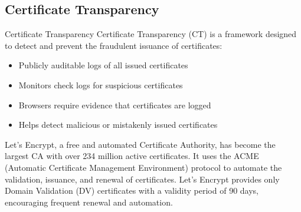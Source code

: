 \subsection{Certificate Transparency}

\begin{concept}{Certificate Transparency}
Certificate Transparency (CT) is a framework designed to detect and prevent the fraudulent issuance of certificates:
\begin{itemize}
    \item Publicly auditable logs of all issued certificates
    \item Monitors check logs for suspicious certificates
    \item Browsers require evidence that certificates are logged
    \item Helps detect malicious or mistakenly issued certificates
\end{itemize}
\end{concept}

\begin{example}
Let's Encrypt, a free and automated Certificate Authority, has become the largest CA with over 234 million active certificates. It uses the ACME (Automatic Certificate Management Environment) protocol to automate the validation, issuance, and renewal of certificates. Let's Encrypt provides only Domain Validation (DV) certificates with a validity period of 90 days, encouraging frequent renewal and automation.
\end{example}


